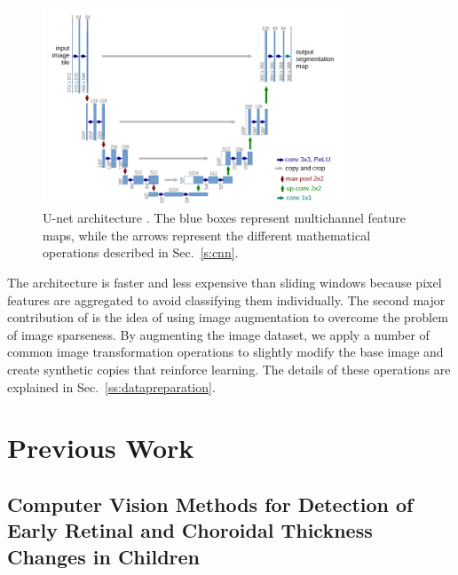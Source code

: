 \documentclass[12pt,a4paper]{scrartcl}
\begin{document}
\begin{figure}[H]
    \centering
    \includegraphics[width=0.8\textwidth]{./images/Unet-architecture.png}
    \caption{U-net architecture \cite{Ronneberger2015}. The blue boxes represent multichannel feature maps, while the arrows represent the different mathematical operations described in Sec.~\ref{s:cnn}.    }
\end{figure}

The architecture is faster and less expensive than sliding windows because pixel features are aggregated to avoid classifying them individually. The second major contribution of \cite{Ronneberger2015} is the idea of using image augmentation to overcome the problem of image sparseness. By augmenting the image dataset, we apply a number of common image transformation operations to slightly modify the base image and create synthetic copies that reinforce learning. The details of these operations are explained in Sec.~\ref{ss:datapreparation}.

\section{Previous Work}\label{s:prevWork}
\subsection{Computer Vision Methods for Detection of Early Retinal and Choroidal Thickness Changes in Children}
\end{document}
